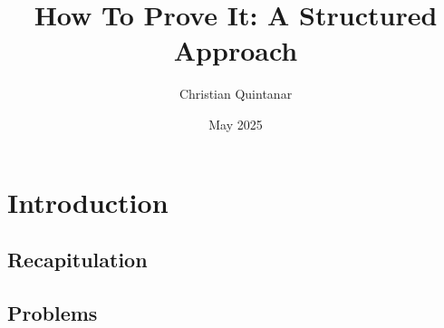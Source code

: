 \documentclass{report}
\title{How To Prove It: A Structured Approach}
\author{Christian Quintanar}
\date{May 2025}
\begin{document}
\maketitle

\chapter{Introduction}

\section{Recapitulation}

\section{Problems}

\end{document}
